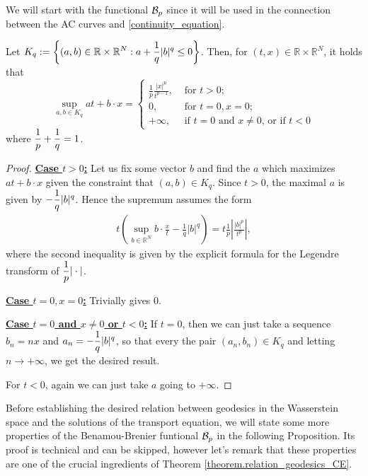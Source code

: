 We will start with the functional $\mathcal{B}_p$ since it will be used in the connection between the AC curves and \eqref{continuity_equation}. 
\begin{lemma}
	\label{lemma.benamou_brenier_functional}
	Let $\displaystyle K_q:=\left\{
	(a,b) \in \mathbb{R}\times \mathbb{R}^N: a + \frac{1}{q}|b|^q \le 0
	\right\}$. Then, for $(t,x) \in \mathbb{R}\times \mathbb{R}^N$, it holds that
	\begin{equation*}
		\sup_{a,b \in K_q} at + b\cdot x =
		\left\{
		\begin{array}{rl}
			\frac{1}{p}\frac{|x|^p}{t^{p-1}},& \text{ for $t>0$;}\\
			0,& \text{ for $t=0, x=0$};\\
			+\infty,& \text{ if $t=0$ and $x\neq 0$, or if $t< 0$}
		\end{array}
		\right.
	\end{equation*}
	where $\displaystyle \frac{1}{p} + \frac{1}{q} = 1$. 
\end{lemma}
\begin{proof}
	\underline{\bf Case $t>0$:} Let us fix some vector $b$ and find the $a$ which maximizes $at + b\cdot x$ given the constraint that $(a,b) \in K_q$. Since $t>0$, the maximal $a$ is given by $\displaystyle -\frac{1}{q}|b|^q$. Hence the supremum assumes the form 
	\begin{align*}
		t\left(\sup_{b \in \mathbb{R}^N}b\cdot\frac{x}{t} -\frac{1}{q}|b|^q \right) = t\frac{1}{p}\left|\frac{|b|^p}{t^p}\right|,
	\end{align*} 
	where the second inequality is given by the explicit formula for the Legendre transform of $\displaystyle \frac{1}{p}|\cdot|$. 
	
	\underline{\bf Case $t=0, x=0$:} Trivially gives $0$. 
	
	\underline{\bf Case $t=0$ and $x \neq 0$ or $t < 0$:} If $t= 0$, then we can just take a sequence $b_n = nx$ and $a_n = \displaystyle  -\frac{1}{q}|b|^q$, so that every the pair $(a_n, b_n) \in K_q$ and letting $n \to +\infty$, we get the desired result. 
	
	For $t < 0$, again we can just take $a$ going to $+\infty$. 
\end{proof}

Before establishing the desired relation between geodesics in the Wasserstein space and the solutions of the transport equation, we will state some more properties of the Benamou-Brenier funtional $\mathcal{B}_p$ in the following Proposition. Its proof is technical and can be skipped, however let's remark that these properties are one of the crucial ingredients of Theorem \ref{theorem.relation_geodesics_CE}. 


